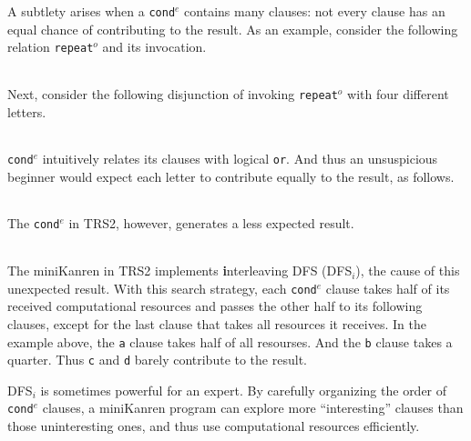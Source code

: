 \documentclass[acmlarge, review=true]{acmart}
\newcommand{\conde}{\texttt{cond$^e$}}
\newcommand{\clisting}[1]{
\begin{center}
  \begin{tabular}{c}
	
    \end{tabular}
\end{center}
}
\newcommand{\repeato}{\texttt{repeat$^o$}}
\newcommand{\DFSi }[0]{DFS$_{i}$}
\begin{document}
A subtlety arises 
when a \conde{} contains many clauses: not every clause has an 
equal chance of contributing to the result. As an example, consider the 
following 
relation \repeato{} and its invocation. 

\clisting{Figures/repeato.rkt}

\noindent Next, consider the following disjunction of invoking \repeato{} with 
four different letters.

\clisting{Figures/example.rkt}

\noindent \conde{} intuitively relates its clauses with logical \texttt{or}. And 
thus an 
unsuspicious beginner would expect each letter to contribute equally to the 
result, as follows.

\clisting{Figures/run-repeato-fair.rkt}

\noindent The \conde{} in TRS2, however, generates a less expected result.

\clisting{Figures/run-repeato-idfs.rkt}

The miniKanren in TRS2 implements \textbf{i}nterleaving DFS (\DFSi), the cause of this 
unexpected result. With this search strategy, each \conde{} clause takes half 
of its received computational resources and passes the other half to its 
following clauses, except for the last clause that takes all resources it 
receives. In the example above, the \texttt{a} clause takes half of all 
resourses. And the \texttt{b} clause takes a quarter. Thus \texttt{c} and 
\texttt{d} barely contribute to the result.


\DFSi{} is sometimes powerful for an expert. By carefully organizing the order 
of \conde{} clauses, a miniKanren program can explore more ``interesting'' 
clauses than those uninteresting ones, and thus use computational resources 
efficiently.

\end{document}

